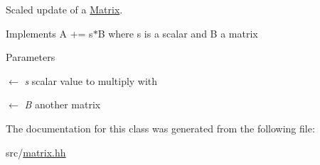 Scaled update of a \hyperlink{classhdnum_1_1Matrix}{Matrix}. 

Implements A += s$\ast$B where s is a scalar and B a matrix


\begin{DoxyParams}{Parameters}
\item[\mbox{$\leftarrow$} {\em s}]scalar value to multiply with \item[\mbox{$\leftarrow$} {\em B}]another matrix \end{DoxyParams}


The documentation for this class was generated from the following file:\begin{DoxyCompactItemize}
\item 
src/\hyperlink{matrix_8hh}{matrix.hh}\end{DoxyCompactItemize}
